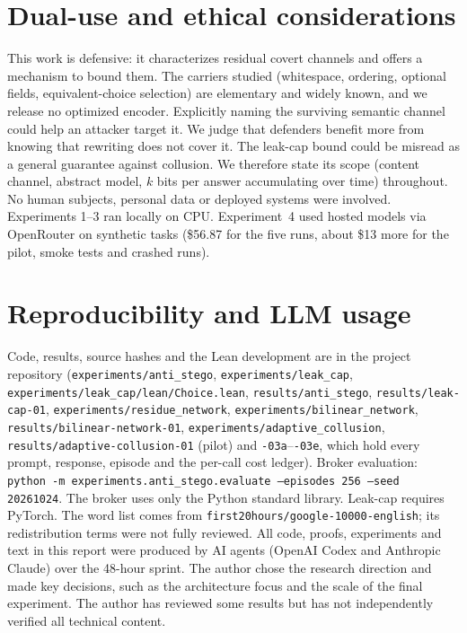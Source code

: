\documentclass[11pt]{article}
\begin{document}
\section{Dual-use and ethical considerations}
This work is defensive: it characterizes residual covert channels and offers a
mechanism to bound them. The carriers studied (whitespace, ordering, optional
fields, equivalent-choice selection) are elementary and widely known, and we
release no optimized encoder. Explicitly naming the surviving semantic channel
could help an attacker target it. We judge that defenders benefit more from
knowing that rewriting does not cover it. The leak-cap bound could be
misread as a general guarantee against collusion. We therefore state its
scope (content channel, abstract model, $k$ bits per answer accumulating over
time) throughout. No human subjects, personal data or deployed systems were
involved. Experiments 1--3 ran locally on CPU. Experiment~4 used hosted models via OpenRouter on synthetic tasks (\$56.87 for the five runs, about \$13 more for the pilot, smoke tests and crashed runs).

\section{Reproducibility and LLM usage}
\sloppy
Code, results, source hashes and the Lean development are in the project
repository (\texttt{experiments/anti\_stego}, \texttt{experiments/leak\_cap},
\texttt{experiments/leak\_cap/lean/Choice.lean}, \texttt{results/anti\_stego},
\texttt{results/leak-cap-01}, \texttt{experiments/residue\_network},
\texttt{experiments/bilinear\_network}, \texttt{results/bilinear-network-01},
\texttt{experiments/adaptive\_collusion}, \texttt{results/adaptive-collusion-01} (pilot) and
\texttt{-03a}--\texttt{-03e}, which hold every prompt, response, episode and
the per-call cost ledger). Broker evaluation:
\texttt{python -m experiments.anti\_stego.evaluate --episodes 256 --seed 20261024}.
The broker uses only the Python standard library. Leak-cap requires PyTorch.
The word list comes from \texttt{first20hours/google-10000-english}; its
redistribution terms were not fully reviewed. All code, proofs, experiments and text in this report were produced by AI
agents (OpenAI Codex and Anthropic Claude) over the 48-hour sprint. The author
chose the research direction and made key decisions, such as the architecture
focus and the scale of the final experiment. The author has reviewed some
results but has not independently verified all technical content.
\end{document}
